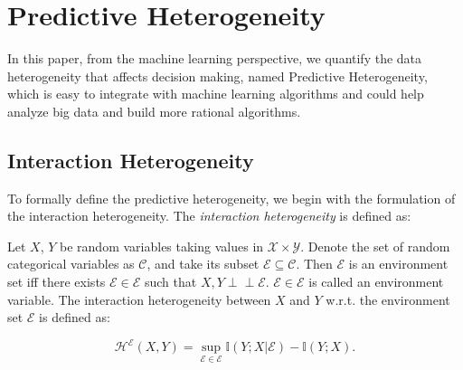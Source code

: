 \section{Predictive Heterogeneity}
In this paper, from the machine learning perspective, we quantify the data heterogeneity that affects decision making, named Predictive Heterogeneity, which is easy to integrate with machine learning algorithms and could help analyze big data and build more rational algorithms.

\subsection{Interaction Heterogeneity}
To formally define the predictive heterogeneity, we begin with the formulation of the interaction heterogeneity.
The \emph{interaction heterogeneity} is defined as:
\begin{definition}
	Let $X$, $Y$ be random variables taking values in $\mathcal X \times \mathcal Y$. Denote the set of random categorical variables as $\mathcal C$, and take its subset $\mathscr E \subseteq \mathcal C$.  Then $\mathscr E$ is an environment set iff there exists $\mathcal E \in \mathscr E$ such that $X, Y \perp \!\!\! \perp \mathcal E$. $\mathcal E \in \mathscr E$ is called an environment variable. The interaction heterogeneity between $X$ and $Y$ w.r.t. the environment set $\mathscr E$ is defined as:
	\begin{small}
	\begin{equation}
	\label{equ:predictive-heterogeneity}
		\mathcal{H}^\mathscr E(X,Y) = \sup_{\mathcal{E} \in \mathscr E}\mathbb{I}(Y;X|\mathcal{E})-\mathbb{I}(Y;X).
	\end{equation} 
	\end{small}
\end{definition}
\vskip -0.1in

